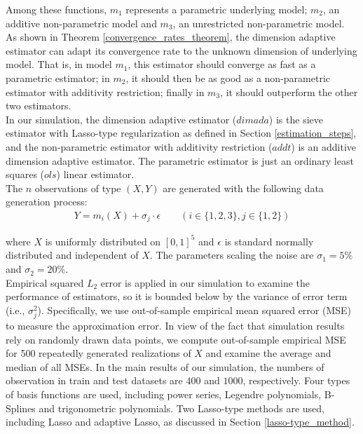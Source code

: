 \documentclass[12pt, a4paper]{article}
\theoremstyle{MAstyle} \newtheorem{assumption}{Assumption}[section]
\theoremstyle{MAstyle} \newtheorem{definition}{Definition}[section]
\theoremstyle{MAstyle} \newtheorem{theorem}{Theorem}[section]
\theoremstyle{MAstyle} \newtheorem{corollary}{Corollary}[section]
\begin{document}
                Among these functions, $m_1$ represents a parametric underlying model; $m_2$, an additive non-parametric model and $m_3$, an unrestricted non-parametric model. As shown in Theorem \ref{convergence_rates_theorem}, the dimension adaptive estimator can adapt its convergence rate to the unknown dimension of underlying model. That is, in model $m_1$, this estimator should converge as fast as a parametric estimator; in $m_2$, it should then be as good as a non-parametric estimator with additivity restriction; finally in $m_3$, it should outperform the other two estimators. \\

                In our simulation, the dimension adaptive estimator ($dimada$) is the sieve estimator with Lasso-type regularization as defined in Section \ref{estimation_steps}, and the non-parametric estimator with additivity restriction ($addt$) is an additive dimension adaptive estimator. The parametric estimator is just an ordinary least squares ($ols$) linear estimator.\\

                The $n$ observations of type $(X,Y)$ are generated with the following data generation process:
                \begin{align*}
                    Y=m_i(X)+\sigma_j \cdot \epsilon \quad \quad (i \in \{1,2,3\}, j \in \{1,2\})
                \end{align*}

                where $X$ is uniformly distributed on $[0,1]^5$ and $\epsilon$ is standard normally distributed and independent of $X$. The parameters scaling the noise are $\sigma_1=5\%$ and $\sigma_2=20\%$. \\
                
                Empirical squared $L_2$ error is applied in our simulation to examine the performance of estimators, so it is bounded below by the variance of error term (i.e., $\sigma_j^2$). Specifically, we use out-of-sample empirical mean squared error (MSE) to measure the approximation error. In view of the fact that simulation results rely on randomly drawn data points, we compute out-of-sample empirical MSE for 500 repeatedly generated realizations of $X$ and examine the average and median of all MSEs. In the main results of our simulation, the numbers of observation in train and test datasets are $400$ and $1000$, respectively. Four types of basis functions are used, including power series, Legendre polynomials, B-Splines and trigonometric polynomials. Two Lasso-type methods are used, including Lasso and adaptive Lasso, as discussed in Section \ref{lasso-type_method}. \\
\end{document}
